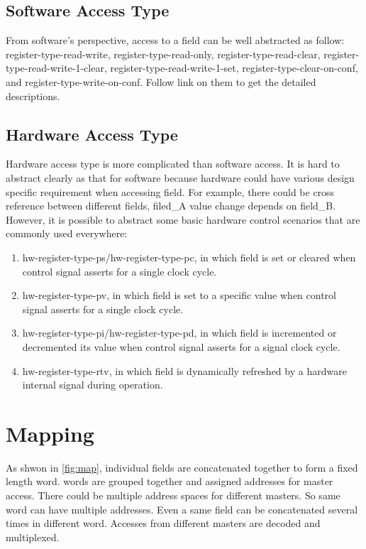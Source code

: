 \documentclass[10pt,oneside]{book}
\begin{document}
\subsection{Software Access Type}
From software's perspective, access to a \gls{field} can be well 
abstracted as follow: 
\gls{register-type-read-write}, 
\gls{register-type-read-only}, 
\gls{register-type-read-clear}, 
\gls{register-type-read-write-1-clear}, 
\gls{register-type-read-write-1-set}, 
\gls{register-type-clear-on-conf}, and 
\gls{register-type-write-on-conf}. Follow link on them to get 
the detailed descriptions. 


\subsection{Hardware Access Type}
Hardware access type is more complicated than software access. It
is hard to abstract clearly as that for software because hardware
could have various design specific requirement when accessing field. 
For example, there could be cross reference between different fields, 
filed\_A value change depends on field\_B. 
However, it is possible to abstract some basic hardware control 
scenarios that are commonly used everywhere: 
\begin{enumerate}
\item \gls{hw-register-type-ps}/\gls{hw-register-type-pc}, in which \gls{field} is set or cleared 
  when control signal asserts for a single clock cycle. 
\item \gls{hw-register-type-pv}, in which \gls{field} is set to a specific
  value when control signal asserts for a single clock cycle. 
\item \gls{hw-register-type-pi}/\gls{hw-register-type-pd}, in which \gls{field} is incremented or 
decremented its value when control signal asserts for a signal clock cycle. 
\item \gls{hw-register-type-rtv}, in which \gls{field} is dynamically refreshed
  by a hardware internal signal during operation.
\end{enumerate}

\section{Mapping}
As shwon in \autoref{fig:map}, individual \gls{field}s are concatenated
together to form a fixed length \gls{word}. \gls{word}s are grouped together
and assigned addresses for \gls{master} access.  
There could be multiple address spaces for different \gls{master}s. So same 
\gls{word} can have multiple addresses. Even a same \gls{field} can be concatenated
several times in different \gls{word}. Accesses from different \gls{master}s are 
decoded and multiplexed. 
\end{document}
